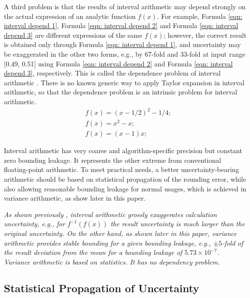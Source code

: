 \documentclass[twoside]{article}
\numberwithin{equation}{section}
\begin{document}
A third problem is that the results of interval arithmetic may depend strongly on the actual expression of an analytic function $f(x)$.  
For example, Formula \eqref{eqn: interval depend 1}, Formula \eqref{eqn: interval depend 2} and Formula \eqref{eqn: interval depend 3} are different expressions of the same $f(x)$; however, the correct result is obtained only through Formula \eqref{eqn: interval depend 1}, and uncertainty may be exaggerated in the other two forms, e.g., by 67-fold and 33-fold at input range [0.49, 0.51] using Formula \eqref{eqn: interval depend 2} and Formula \eqref{eqn: interval depend 3}, respectively.  
This is called the dependence problem of interval arithmetic \cite{Interval_Arithmetic}.  
There is no known generic way to apply Taylor expansion in interval arithmetic, so that the dependence problem is an intrinsic problem for interval arithmetic.
\begin{align}
\label{eqn: interval depend 1} & 
f(x) = (x - 1/2)^2 - 1/4; \\
\label{eqn: interval depend 2} & 
f(x) = x^{2} - x; \\
\label{eqn: interval depend 3} & 
f(x) = (x - 1) x;
\end{align}

Interval arithmetic has very coarse and algorithm-specific precision but constant zero bounding leakage.  
It represents the other extreme from conventional floating-point arithmetic.  
To meet practical needs, a better uncertainty-bearing arithmetic should be based on statistical propagation of the rounding error, while also allowing reasonable bounding leakage for normal usages, which is achieved in variance arithmetic, as show later in this paper.

\emph{
As shown previously \cite{Prev_Precision_Arithmetic}, interval arithmetic grossly exaggerates calculation uncertainty, e.g., for $f^{-1}(f(x))$ the result uncertainty is much larger than the original uncertainty.
On the other hand, as shown later in this paper, variance arithmetic provides stable bounding for a given bounding leakage, e.g., $\pm 5$-fold of the result deviation from the mean for a bounding leakage of $5.73 \times 10^{-7}$.
Variance arithmetic is based on statistics.
It has no dependency problem.
}


\subsection{Statistical Propagation of Uncertainty \cite{Prev_Precision_Arithmetic}}
\end{document}
